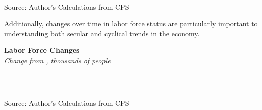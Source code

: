 \documentclass{report}
\begin{document}
{{{{{{{\begin{minipage}{0.76\textwidth}
\vspace{-3mm}

\noindent {} \setlength{\tabcolsep}{3.0pt} \color{black!90}
		{\renewcommand{\arraystretch}{1.52}
		 \begin{tabular}{p{27.8mm} R{11.2mm} R{10.4mm} R{10.4mm} R{10.2mm} R{10.6mm} R{10.4mm} R{10.4mm}}
			 \hline
		\end{tabular}
		}	\\
		
\vspace{-3mm}		
		
\footnotesize{Source: Author's Calculations from CPS}\\

\vspace{3mm}

\small Additionally, changes over time in labor force status are particularly important to understanding both secular and cyclical trends in the economy. \\ 

\vspace{2mm}


\noindent \normalsize \textbf{Labor Force Changes}\\
\footnotesize{\textit{Change from , thousands of people}}\\

\vspace{-3mm}

\noindent {} \setlength{\tabcolsep}{3.0pt} \color{black!90}
		{\renewcommand{\arraystretch}{1.52}
		 \begin{tabular}{p{27.8mm} R{11.2mm} R{10.4mm} R{10.4mm} R{10.2mm} R{10.6mm} R{10.4mm} R{10.4mm}}
			 \hline
		\end{tabular}
		}	\\
		
\vspace{-3mm}	
	
\footnotesize{Source: Author's Calculations from CPS}


\end{minipage}

\newpage

}}}}}}}
\end{document}
